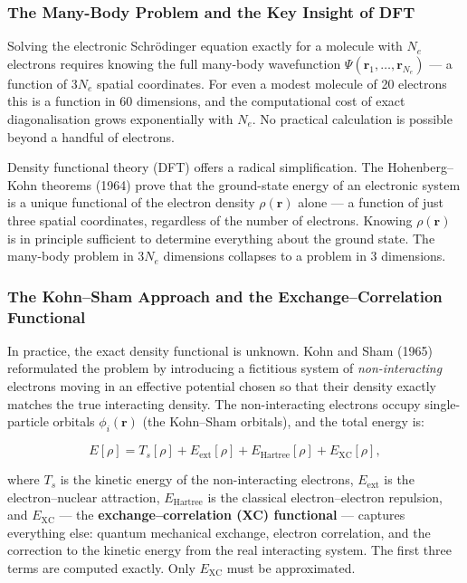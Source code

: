 \subsubsection{The Many-Body Problem and the Key Insight of DFT}

Solving the electronic Schrödinger equation exactly for a molecule with $N_e$
electrons requires knowing the full many-body wavefunction
$\Psi(\mathbf{r}_1, \ldots, \mathbf{r}_{N_e})$ --- a function of $3N_e$ spatial
coordinates. For even a modest molecule of 20 electrons this is a function in 60
dimensions, and the computational cost of exact diagonalisation grows
exponentially with $N_e$. No practical calculation is possible beyond a handful
of electrons.

Density functional theory (DFT) offers a radical simplification. The
Hohenberg--Kohn theorems (1964) prove that the ground-state energy of an
electronic system is a unique functional of the electron density
$\rho(\mathbf{r})$ alone --- a function of just three spatial coordinates,
regardless of the number of electrons. Knowing $\rho(\mathbf{r})$ is in principle
sufficient to determine everything about the ground state. The many-body problem
in $3N_e$ dimensions collapses to a problem in 3 dimensions.

\subsubsection{The Kohn--Sham Approach and the Exchange--Correlation Functional}

In practice, the exact density functional is unknown. Kohn and Sham (1965)
reformulated the problem by introducing a fictitious system of \emph{non-interacting}
electrons moving in an effective potential chosen so that their density exactly
matches the true interacting density. The non-interacting electrons occupy
single-particle orbitals $\phi_i(\mathbf{r})$ (the Kohn--Sham orbitals), and
the total energy is:

\begin{equation}
  E[\rho] = T_s[\rho] + E_\text{ext}[\rho] + E_\text{Hartree}[\rho]
            + E_\text{XC}[\rho],
\end{equation}

where $T_s$ is the kinetic energy of the non-interacting electrons, $E_\text{ext}$
is the electron--nuclear attraction, $E_\text{Hartree}$ is the classical
electron--electron repulsion, and $E_\text{XC}$ --- the
\textbf{exchange--correlation (XC) functional} --- captures everything else:
quantum mechanical exchange, electron correlation, and the correction to the
kinetic energy from the real interacting system. The first three terms are computed
exactly. Only $E_\text{XC}$ must be approximated.


